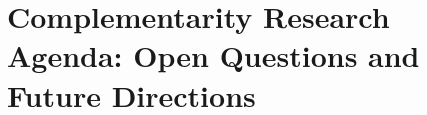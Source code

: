 
\chapter{Complementarity Research Agenda: Open Questions and Future Directions}
\label{app:method-research}

\begin{abstract}
This appendix presents the key concepts and formalizations for Complementarity Research Agenda: Open Questions and Future Directions.
It provides theoretical foundations, practical applications, and integration
points with other components of the Evidence-Based Framework (EBF).
The content supports decision-making and behavioral analysis in the context
of complementarity and context-dependent outcomes.
\end{abstract}


